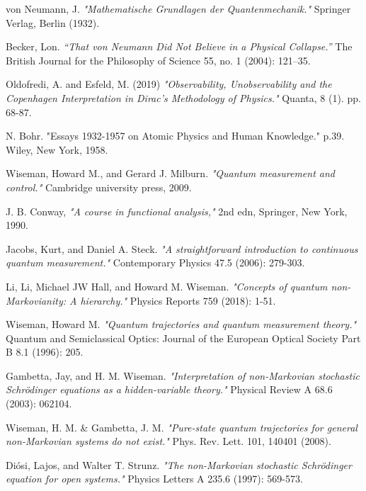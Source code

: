 \documentclass[11pt, a4paper]{article} %
\begin{document}
\begin{thebibliography}{1}
{
von Neumann, J. {\em "Mathematische Grundlagen der Quantenmechanik."} Springer Verlag, Berlin (1932).

Becker, Lon. {\em “That von Neumann Did Not Believe in a Physical Collapse.”} The British Journal for the Philosophy of Science 55, no. 1 (2004): 121–35.

Oldofredi, A. and Esfeld, M. (2019) {\em "Observability, Unobservability and the Copenhagen Interpretation in Dirac's Methodology of Physics."} Quanta, 8 (1). pp. 68-87.

N. Bohr. {"Essays 1932-1957 on Atomic Physics and Human Knowledge."} p.39. Wiley, New York, 1958.


Wiseman, Howard M., and Gerard J. Milburn. {\em "Quantum measurement and control."} Cambridge university press, 2009.

J. B. Conway, {\em "A course in functional analysis,"} 2nd edn, Springer, New York, 1990.

Jacobs, Kurt, and Daniel A. Steck. {\em "A straightforward introduction to continuous quantum measurement."} Contemporary Physics 47.5 (2006): 279-303.

Li, Li, Michael JW Hall, and Howard M. Wiseman. {\em "Concepts of quantum non-Markovianity: A hierarchy."} Physics Reports 759 (2018): 1-51.

Wiseman, Howard M. {\em "Quantum trajectories and quantum measurement theory."} Quantum and Semiclassical Optics: Journal of the European Optical Society Part B 8.1 (1996): 205.

Gambetta, Jay, and H. M. Wiseman. {\em "Interpretation of non-Markovian stochastic Schrödinger equations as a hidden-variable theory."} Physical Review A 68.6 (2003): 062104.

Wiseman, H. M. \& Gambetta, J. M. {\em "Pure-state quantum trajectories for general non-Markovian systems do not exist."} Phys. Rev. Lett. 101, 140401 (2008).

Diósi, Lajos, and Walter T. Strunz. {\em "The non-Markovian stochastic Schrödinger equation for open systems."} Physics Letters A 235.6 (1997): 569-573.

}
\end{thebibliography}
\end{document}
